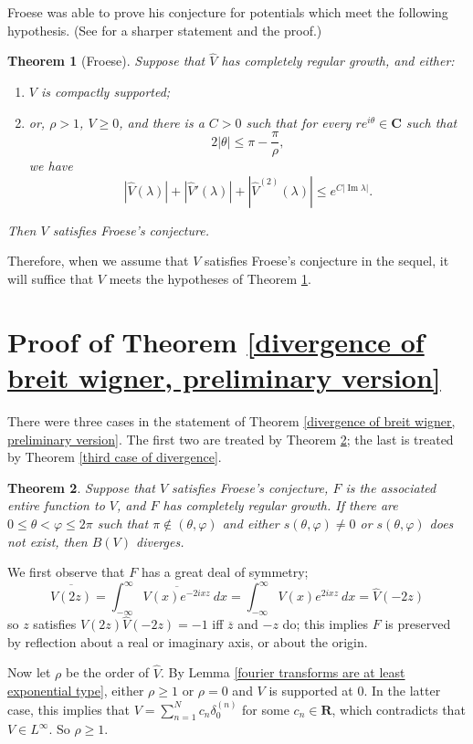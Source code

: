 \documentclass[12pt]{report}
\newcommand{\RR}{\mathbf{R}}
\newcommand{\CC}{\mathbf{C}}
\renewcommand{\Im}{\operatorname{Im}}
\newtheorem{theorem}{Theorem}[chapter]
\theoremstyle{definition}
\begin{document}
Froese was able to prove his conjecture for potentials which meet the following hypothesis. (See \cite[Theorem 1.3]{froese1997asymptotic} for a sharper statement and the proof.)
\begin{theorem}[Froese]
\label{Froese conjecture theorem}
Suppose that $\hat V$ has completely regular growth, and either:
\begin{enumerate}
\item $V$ is compactly supported;
\item or, $\rho > 1$, $V \geq 0$, and there is a $C > 0$ such that for every $re^{i\theta} \in \CC$ such that
$$2|\theta| \leq \pi - \frac{\pi}{\rho},$$
we have
$$|\hat V(\lambda)| + |\hat V'(\lambda)| + |\hat V^{(2)}(\lambda)| \leq e^{C|\Im \lambda|}.$$
\end{enumerate}
Then $V$ satisfies Froese's conjecture.
\end{theorem}
Therefore, when we assume that $V$ satisfies Froese's conjecture in the sequel, it will suffice that $V$ meets the hypotheses of Theorem \ref{Froese conjecture theorem}.

\section{Proof of Theorem \ref{divergence of breit wigner, preliminary version}}
There were three cases in the statement of Theorem \ref{divergence of breit wigner, preliminary version}.
The first two are treated by Theorem \ref{divergence of breit wigner}; the last is treated by Theorem \ref{third case of divergence}.

\begin{theorem}
\label{divergence of breit wigner}
Suppose that $V$ satisfies Froese's conjecture, $F$ is the associated entire function to $V$, and $F$ has completely regular growth.
If there are $0 \leq \theta < \varphi \leq 2\pi$ such that $\pi \notin (\theta, \varphi)$ and either $s(\theta, \varphi) \neq 0$ or $s(\theta, \varphi)$ does not exist, then $B(V)$ diverges.
\end{theorem}

We first observe that $F$ has a great deal of symmetry;
$$\overline{\hat V(2z)} = \int_{-\infty}^\infty \overline{V(x)e^{-2ixz}} ~dx = \int_{-\infty}^\infty V(x) e^{2ixz} ~dx = \hat V(-2z)$$
so $z$ satisfies $\hat V(2z) \hat V(-2z) = -1$ iff $\overline z$ and $-z$ do; this implies $F$ is preserved by reflection about a real or imaginary axis, or about the origin.

Now let $\rho$ be the order of $\hat V$. By Lemma \ref{fourier transforms are at least exponential type}, either $\rho \geq 1$ or $\rho = 0$ and $V$ is supported at $0$.
In the latter case, this implies that $V = \sum_{n=1}^N c_n\delta_0^{(n)}$ for some $c_n \in \RR$, which contradicts that $V \in L^\infty$.
So $\rho \geq 1$.
\end{document}
